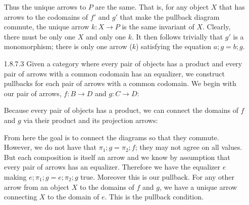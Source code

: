 \documentclass{article}
\begin{document}
\begin{enumerate}
  Thus the unique arrows to $P$ are the same.
  That is, for any object $X$ that has arrows to the codomains of $f'$ and $g'$ that make the pullback diagram commute, the unique arrow $k : X \rightarrow P$ is the same invariant of $X$.
  Clearly, there must be only one $X$ and only one $k$.
  It then follows trivially that $g'$ is a monomorphism; there is only one arrow ($k$) satisfying the equation $a; g = b; g$.

\newpage
\item [1.8.7.3]
  Given a category where every pair of objects has a product and every pair of arrows with a common codomain has an equalizer, we construct pullbacks for each pair of arrows with a common codomain.
  We begin with our pair of arrows, $f : B \rightarrow D$ and $g : C \rightarrow D$:
  \begin{center}
  \end{center}
  Because every pair of objects has a product, we can connect the domains of $f$ and $g$ via their product and its projection arrows:
  \begin{center}
  \end{center}
  From here the goal is to connect the diagrams so that they commute.
  However, we do not have that $\pi_1; g = \pi_2; f$; they may not agree on all values.
  But each composition is itself an arrow and we know by assumption that every pair of arrows has an equalizer.
  Therefore we have the equalizer $e$ making $e; \pi_1; g = e; \pi_2; g$ true.
  Moreover this is our pullback.
  For any other arrow from an object $X$ to the domains of $f$ and $g$, we have a unique arrow connecting $X$ to the domain of $e$.
  This is the pullback condition.
  \begin{center}
\end{center}
\end{enumerate}
\end{document}
